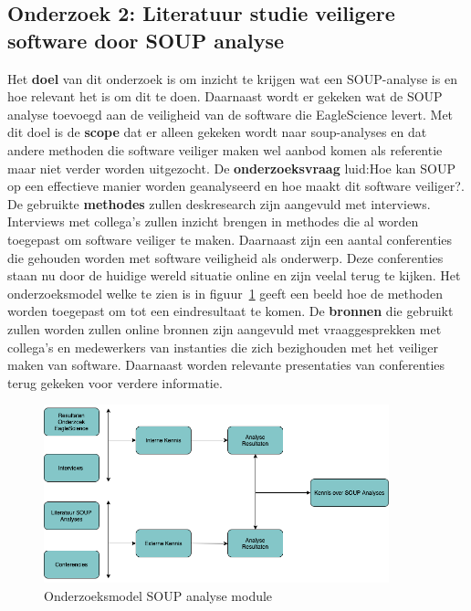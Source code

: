 \subsection{Onderzoek 2: Literatuur studie veiligere software door SOUP analyse}\label{sec:onderzoek:-literatuur-studie-soup}
Het \textbf{doel} van dit onderzoek is om inzicht te krijgen wat een SOUP-analyse is en hoe relevant het is om dit te doen. Daarnaast wordt er gekeken wat de SOUP analyse toevoegd aan de veiligheid van de software die EagleScience levert. Met dit doel is de \textbf{scope} dat er alleen gekeken wordt naar soup-analyses en dat andere methoden die software veiliger maken wel aanbod komen als referentie maar niet verder worden uitgezocht.  De \textbf{onderzoeksvraag} luid:Hoe kan SOUP op een effectieve manier worden geanalyseerd en hoe maakt dit software veiliger?. De gebruikte \textbf{methodes} zullen deskresearch zijn aangevuld met interviews. Interviews met collega's zullen inzicht brengen in methodes die al worden toegepast om software veiliger te maken. Daarnaast zijn een aantal conferenties die gehouden worden met software veiligheid als onderwerp. Deze conferenties staan nu door de huidige wereld situatie online en zijn veelal terug te kijken. Het onderzoeksmodel welke te zien is in figuur~\ref{fig:OnderzoeksModelNoodZaakSOUP} geeft een beeld hoe de methoden worden toegepast om tot een eindresultaat te komen. De \textbf{bronnen} die gebruikt zullen worden zullen online bronnen zijn aangevuld met vraaggesprekken met collega's en medewerkers van instanties die zich bezighouden met het veiliger maken van software. Daarnaast worden relevante presentaties van conferenties terug gekeken voor verdere informatie.
\begin{figure}[htbp]
    \myfloatalign
    \includegraphics[width=10cm]{gfx/OnderzoeksmodelSOUP}
    \caption{Onderzoeksmodel SOUP analyse module}
    \label{fig:OnderzoeksModelNoodZaakSOUP}
\end{figure}

